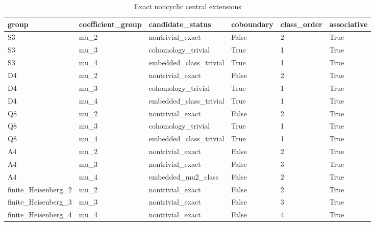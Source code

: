 \begin{table}[t]
\centering
\caption{Exact noncyclic central extensions}
\begin{tabular}{llllll}
\toprule
group & coefficient\_group & candidate\_status & coboundary & class\_order & associative \\
\midrule
S3 & mu\_2 & nontrivial\_exact & False & 2 & True \\
S3 & mu\_3 & cohomology\_trivial & True & 1 & True \\
S3 & mu\_4 & embedded\_class\_trivial & True & 1 & True \\
D4 & mu\_2 & nontrivial\_exact & False & 2 & True \\
D4 & mu\_3 & cohomology\_trivial & True & 1 & True \\
D4 & mu\_4 & embedded\_class\_trivial & True & 1 & True \\
Q8 & mu\_2 & nontrivial\_exact & False & 2 & True \\
Q8 & mu\_3 & cohomology\_trivial & True & 1 & True \\
Q8 & mu\_4 & embedded\_class\_trivial & True & 1 & True \\
A4 & mu\_2 & nontrivial\_exact & False & 2 & True \\
A4 & mu\_3 & nontrivial\_exact & False & 3 & True \\
A4 & mu\_4 & embedded\_mu2\_class & False & 2 & True \\
finite\_Heisenberg\_2 & mu\_2 & nontrivial\_exact & False & 2 & True \\
finite\_Heisenberg\_3 & mu\_3 & nontrivial\_exact & False & 3 & True \\
finite\_Heisenberg\_4 & mu\_4 & nontrivial\_exact & False & 4 & True \\
\bottomrule
\end{tabular}
\end{table}
